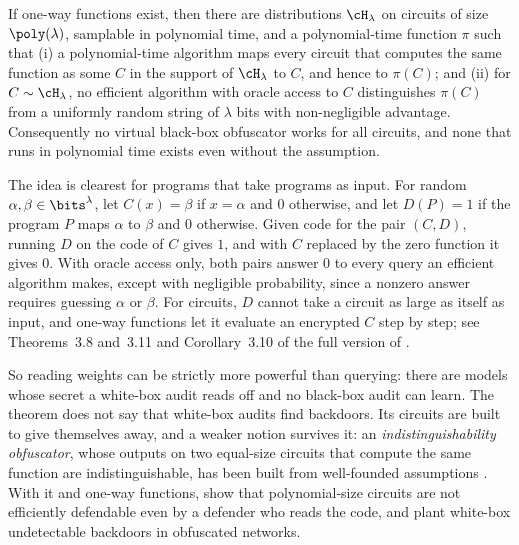\begin{refsection}
\begin{theorem}\label{thm:backdoors:bgi}
If one-way functions exist, then there are distributions $\cH_\lambda$ on circuits of size $\poly(\lambda)$, samplable in polynomial time, and a polynomial-time function $\pi$ such that (i) a polynomial-time algorithm maps every circuit that computes the same function as some $C$ in the support of $\cH_\lambda$ to $C$, and hence to $\pi(C)$; and (ii) for $C\sim\cH_\lambda$, no efficient algorithm with oracle access to $C$ distinguishes $\pi(C)$ from a uniformly random string of $\lambda$ bits with non-negligible advantage. Consequently no virtual black-box obfuscator works for all circuits, and none that runs in polynomial time exists even without the assumption.
\end{theorem}

\begin{proofsketch}
The idea is clearest for programs that take programs as input. For random $\alpha,\beta\in\bits^\lambda$, let $C(x)=\beta$ if $x=\alpha$ and $0$ otherwise, and let $D(P)=1$ if the program $P$ maps $\alpha$ to $\beta$ and $0$ otherwise. Given code for the pair $(C,D)$, running $D$ on the code of $C$ gives $1$, and with $C$ replaced by the zero function it gives $0$. With oracle access only, both pairs answer $0$ to every query an efficient algorithm makes, except with negligible probability, since a nonzero answer requires guessing $\alpha$ or $\beta$. For circuits, $D$ cannot take a circuit as large as itself as input, and one-way functions let it evaluate an encrypted $C$ step by step; see Theorems~3.8 and~3.11 and Corollary~3.10 of the full version of \textcite{BarakEtAl2012}.
\end{proofsketch}

So reading weights can be strictly more powerful than querying: there are models whose secret a white-box audit reads off and no black-box audit can learn. The theorem does not say that white-box audits find backdoors. Its circuits are built to give themselves away, and a weaker notion survives it: an \emph{indistinguishability obfuscator}, whose outputs on two equal-size circuits that compute the same function are indistinguishable, has been built from well-founded assumptions \parencite{JainLinSahai2021}. With it and one-way functions, \textcite{ChristianoEtAl2025} show that polynomial-size circuits are not efficiently defendable even by a defender who reads the code, and \textcite{KalavasisEtAl2024} plant white-box undetectable backdoors in obfuscated networks.


\end{refsection}
